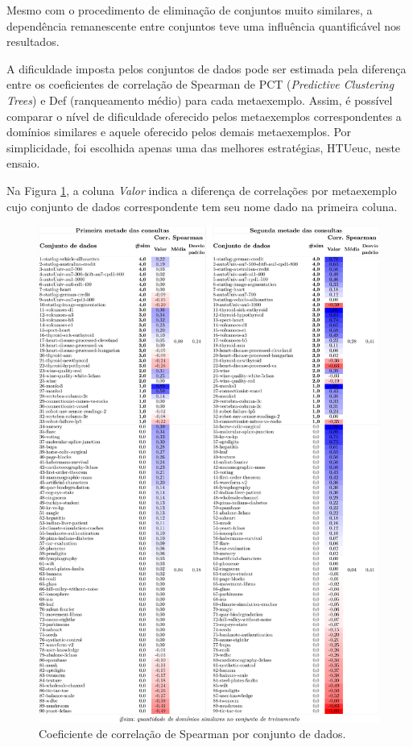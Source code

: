 Mesmo com o procedimento de eliminação de conjuntos muito similares, a dependência remanescente entre conjuntos teve uma influência quantificável nos resultados.

A dificuldade imposta pelos conjuntos de dados pode ser estimada pela diferença entre os coeficientes de correlação de Spearman de PCT (\textit{Predictive Clustering Trees}) e Def (ranqueamento médio)
para cada metaexemplo.
Assim, é possível comparar o nível de dificuldade oferecido pelos metaexemplos correspondentes a domínios similares  e aquele oferecido pelos demais metaexemplos.
Por simplicidade, foi escolhida apenas uma das melhores estratégias, HTUeuc, neste ensaio.

Na Figura \ref{dsscorr}, a coluna \textit{Valor} indica a diferença de correlações por metaexemplo cujo conjunto de dados correspondente tem seu nome dado na primeira coluna.
\begin{figure}
\centering
\includegraphics[scale=0.195]{images/dsscorr.pdf}
\caption[Coeficiente de correlação de Spearman por conjunto de dados.]{Coeficiente de correlação de Spearman por conjunto de dados.}
\label{dsscorr}
\end{figure}
